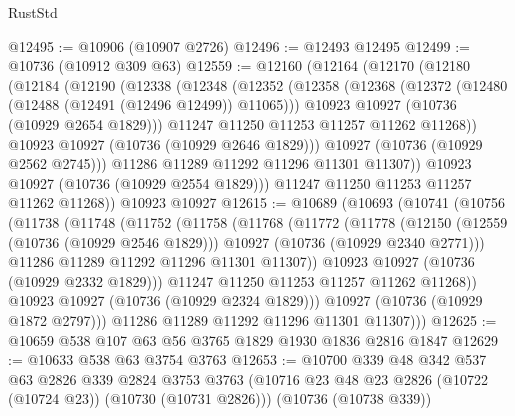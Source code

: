 \begin{lexlean}{RustStd}
\begin{coremodule}
@12495 := @10906 (@10907 @2726)
@12496 := @12493 @12495
@12499 := @10736 (@10912 @309 @63)
@12559 := @12160
    (@12164
      (@12170
        (@12180
          (@12184
            (@12190
              (@12338
                (@12348
                  (@12352
                    (@12358
                      (@12368
                        (@12372 (@12480 (@12488 (@12491 (@12496 @12499)) @11065)))
                        @10923
                        @10927
                        (@10736 (@10929 @2654 @1829)))
                      @11247
                      @11250
                      @11253
                      @11257
                      @11262
                      @11268))
                  @10923
                  @10927
                  (@10736 (@10929 @2646 @1829)))
                @10927
                (@10736 (@10929 @2562 @2745)))
              @11286
              @11289
              @11292
              @11296
              @11301
              @11307))
          @10923
          @10927
          (@10736 (@10929 @2554 @1829)))
        @11247
        @11250
        @11253
        @11257
        @11262
        @11268))
    @10923
    @10927
@12615 := @10689
    (@10693
      (@10741
        (@10756
          (@11738
            (@11748
              (@11752
                (@11758
                  (@11768
                    (@11772
                      (@11778
                        (@12150
                          (@12559 (@10736 (@10929 @2546 @1829)))
                          @10927
                          (@10736 (@10929 @2340 @2771)))
                        @11286
                        @11289
                        @11292
                        @11296
                        @11301
                        @11307))
                    @10923
                    @10927
                    (@10736 (@10929 @2332 @1829)))
                  @11247
                  @11250
                  @11253
                  @11257
                  @11262
                  @11268))
              @10923
              @10927
              (@10736 (@10929 @2324 @1829)))
            @10927
            (@10736 (@10929 @1872 @2797)))
          @11286
          @11289
          @11292
          @11296
          @11301
          @11307)))
@12625 := @10659 @538 @107 @63 @56 @3765 @1829 @1930 @1836 @2816 @1847
@12629 := @10633 @538 @63 @3754 @3763
@12653 := @10700
    @339
    @48
    @342
    @537
    @63
    @2826
    @339
    @2824
    @3753
    @3763
    (@10716 @23 @48 @23 @2826 (@10722 (@10724 @23)) (@10730 (@10731 @2826)))
    (@10736 (@10738 @339))

\end{coremodule}
\end{lexlean}
